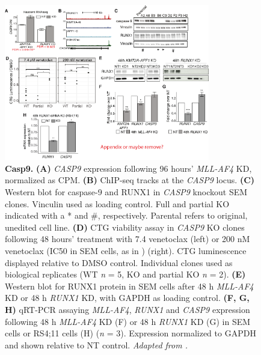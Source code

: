 \begin{figure}[ht]
    \centering
    \includegraphics[width=0.8\textwidth,height=0.8\textheight,keepaspectratio]{figures/chapter4/ch4_casp9.png}
    \caption[{Casp9.}]
    {\textbf{Casp9.} 
    \textbf{(A)} \textit{CASP9} expression following 96 hours’ \textit{MLL-AF4} KD, normalized as CPM. 
    \textbf{(B)} ChIP-seq tracks at the \textit{CASP9} locus. 
    \textbf{(C)} Western blot for caspase-9 and RUNX1 in \textit{CASP9} knockout SEM clones. Vinculin used as loading control. Full and partial KO indicated with a * and \#, respectively. Parental refers to original, unedited cell line. 
    \textbf{(D)} CTG viability assay in \textit{CASP9} KO clones following 48 hours’ treatment with 7.4 \microm{} venetoclax (left) or 200 nM venetoclax (IC50 in SEM cells, as in \cite{benito_mll-rearranged_2015}) (right). CTG luminescence displayed relative to DMSO control. Individual clones used as biological replicates (WT \textit{n} = 5, KO and partial KO \textit{n} = 2). 
    \textbf{(E)} Western blot for RUNX1 protein in SEM cells after 48 h \textit{MLL-AF4} KD or 48 h \textit{RUNX1} KD, with GAPDH as loading control. 
    \textbf{(F, G, H)} qRT-PCR assaying \textit{MLL-AF4}, \textit{RUNX1} and \textit{CASP9} expression following 48 h \textit{MLL-AF4} KD (F) or 48 h \textit{RUNX1} KD (G) in SEM cells or RS4;11 cells (H) (\textit{n} = 3). Expression normalized to GAPDH and shown relative to NT control. 
    \textit{Adapted from \cite{harman_kmt2a-aff1_2021}.}
    }
    \label{fig:ch4_casp9}
\end{figure}

